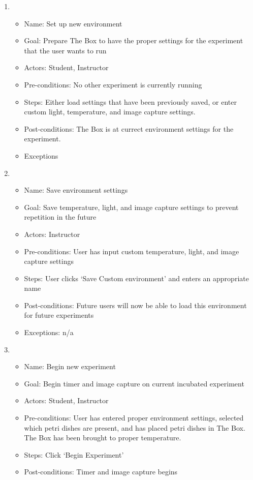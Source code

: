 \begin{enumerate}
	\item 
	\begin{itemize}
		\item Name: Set up new environment
		\item Goal: Prepare The Box to have the proper settings for the experiment that the user wants to run
		\item Actors: Student, Instructor
		\item Pre-conditions: No other experiment is currently running
		\item Steps: Either load settings that have been previously saved, or enter custom light, temperature, and image capture settings. 
		\item Post-conditions: The Box is at currect environment settings for the experiment.
		\item Exceptions
	\end{itemize}
	\item 
	\begin{itemize}
		\item Name: Save environment settings
		\item Goal: Save temperature, light, and image capture settings to prevent repetition in the future
		\item Actors: Instructor
		\item Pre-conditions: User has input custom temperature, light, and image capture settings
		\item Steps: User clicks `Save Custom environment' and enters an appropriate name
		\item Post-conditions: Future users will now be able to load this environment for future experiments
		\item Exceptions: n/a
	\end{itemize}
	\item 
	\begin{itemize}
		\item Name: Begin new experiment
		\item Goal: Begin timer and image capture on current incubated experiment
		\item Actors:  Student, Instructor
		\item Pre-conditions: User has entered proper environment settings, selected which petri dishes are present, and has placed petri dishes in The Box. The Box has been brought to proper temperature.
		\item Steps: Click `Begin Experiment'
		\item Post-conditions: Timer and image capture begins

\end{itemize}
\end{enumerate}

